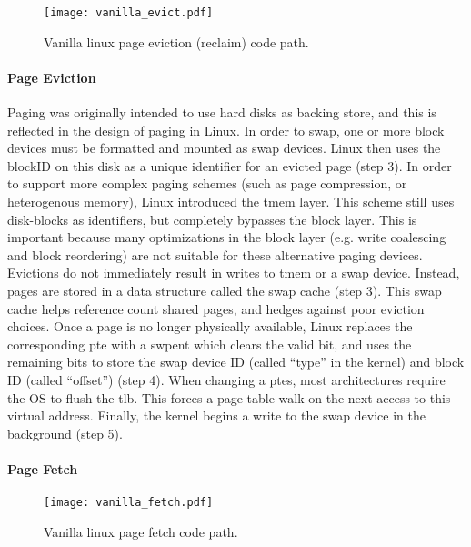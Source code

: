 \begin{figure}[h] \centering
  \texttt{[image: vanilla\_evict.pdf]}
  \caption{Vanilla linux page eviction (reclaim) code path.}
  \label{fig:vanilla_evict}
\end{figure}

\paragraph{Page Eviction}
Paging was originally intended to use hard disks as backing store, and this is
reflected in the design of paging in Linux. In order to swap, one or more block
devices must be formatted and mounted as swap devices. Linux then uses the
blockID on this disk as a unique identifier for an evicted page (step 3). In
order to support more complex paging schemes (such as page compression, or
heterogenous memory), Linux introduced the \gls{tmem} layer\cite{tmem}. This
scheme still uses disk-blocks as identifiers, but completely bypasses the block
layer. This is important because many optimizations in the block layer (e.g.
write coalescing and block reordering) are not suitable for these alternative
paging devices. Evictions do not immediately result in writes to \gls{tmem} or
a swap device. Instead, pages are stored in a data structure called the swap
cache (step 3). This swap cache helps reference count shared pages, and hedges
against poor eviction choices. Once a page is no longer physically available,
Linux replaces the corresponding \gls{pte} with a \gls{swpent} which clears the
valid bit, and uses the remaining bits to store the swap device ID (called
``type'' in the kernel) and block ID (called ``offset'') (step 4).  When
changing a \glspl{pte}, most architectures require the OS to flush the
\gls{tlb}. This forces a page-table walk on the next access to this virtual
address. Finally, the kernel begins a write to the swap device in the
background (step 5).

\paragraph{Page Fetch}

\begin{figure}[h] \centering
  \texttt{[image: vanilla\_fetch.pdf]}
  \caption{Vanilla linux page fetch code path.}
  \label{fig:vanilla_fetch}
\end{figure}


